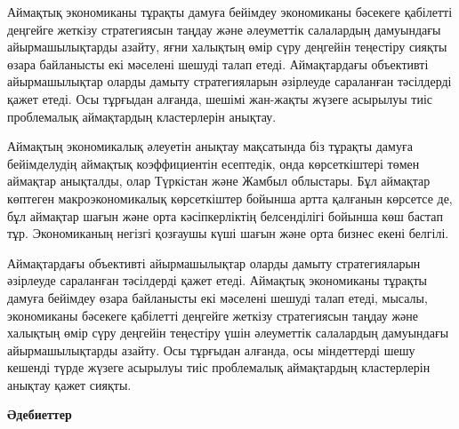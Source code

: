 \begin{multicols}{2}
Аймақтық экономиканы тұрақты дамуға бейімдеу экономиканы бәсекеге
қабілетті деңгейге жеткізу стратегиясын таңдау және әлеуметтік
салалардың дамуындағы айырмашылықтарды азайту, яғни халықтың өмір сүру
деңгейін теңестіру сияқты өзара байланысты екі мәселені шешуді талап
етеді. Аймақтардағы объективті айырмашылықтар оларды дамыту
стратегияларын әзірлеуде сараланған тәсілдерді қажет етеді. Осы тұрғыдан
алғанда, шешімі жан-жақты жүзеге асырылуы тиіс проблемалық аймақтардың
кластерлерін анықтау.

Аймақтың экономикалық әлеуетін анықтау мақсатында біз тұрақты дамуға
бейімделудің аймақтық коэффициентін есептедік, онда көрсеткіштері төмен
аймақтар анықталды, олар Түркістан және Жамбыл облыстары. Бұл аймақтар
көптеген макроэкономикалық көрсеткіштер бойынша артта қалғанын көрсетсе
де, бұл аймақтар шағын және орта кәсіпкерліктің белсенділігі бойынша көш
бастап тұр. Экономиканың негізгі қозғаушы күші шағын және орта бизнес
екені белгілі.

Аймақтардағы объективті айырмашылықтар оларды дамыту стратегияларын
әзірлеуде сараланған тәсілдерді қажет етеді. Аймақтық экономиканы
тұрақты дамуға бейімдеу өзара байланысты екі мәселені шешуді талап
етеді, мысалы, экономиканы бәсекеге қабілетті деңгейге жеткізу
стратегиясын таңдау және халықтың өмір сүру деңгейін теңестіру үшін
әлеуметтік салалардың дамуындағы айырмашылықтарды азайту. Осы тұрғыдан
алғанда, осы міндеттерді шешу кешенді түрде жүзеге асырылуы тиіс
проблемалық аймақтардың кластерлерін анықтау қажет сияқты.
\end{multicols}

\begin{center}
{\bfseries Әдебиеттер}
\end{center}

